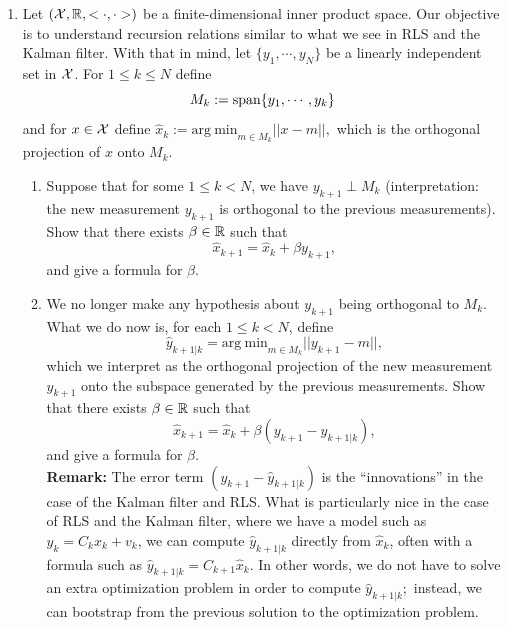 \documentclass[letterpaper]{article}
\begin{document}
\begin{enumerate}
\begin{enumerate}
    \item Compute the distribution of $X|_{\{Z=z\}}$ conditioned on $Y|_{\{ Z=z\} }= y$.

\item  Compute the conditional distribution of  $  X | _{\left[\begin{array}{r} Y=y\\  Z=z\end{array} \right] } $, or more compactly, $ X_{|Y=y,Z=z}$, the conditional distribution of  $X$ given the vector $[Y=y,Z=z]^\top$.

    \item Compare your answers for (b) and (c).
\end{enumerate}

\newpage

\item  Let $({\cal X}, \mathbb R, <\cdot, \cdot>)$ be a finite-dimensional inner product space. Our objective is to understand recursion relations similar to what we see in RLS and the Kalman filter. With that in mind, let $\{y_1, \cdots, y_N \}$ be a linearly independent set in ${\cal X}$. For $1 \le k \le N$ define     $$M_k: = \textrm{span} \{ y_1, \cdots, y_k \}$$
      and for $x \in {\cal X}$ define $ \widehat{x}_k := \mathrm{arg~min}_{m\in M_k} ||x-m||,$ which is the orthogonal projection of $x$ onto $M_k$.
  \begin{enumerate}
\setlength{\itemsep}{.1in}
\renewcommand{\labelenumi}{(\alph{enumi})}

\item  Suppose that for some $1 \le k < N$, we have $y_{k+1} \perp M_k$ (interpretation: the new measurement $y_{k+1}$ is orthogonal to the previous measurements). Show that there exists $\beta \in \mathbb R$ such that
$$\widehat{x}_{k+1} = \widehat{x}_k + \beta y_{k+1},$$
and give a formula for $\beta$.

\item We no longer make any hypothesis about $y_{k+1}$ being orthogonal to $M_k$. What we do now is, for each $1 \le k < N$, define
$$\widehat{y}_{k+1|k} = \mathrm{arg~min}_{m\in M_{k}} ||y_{k+1}-m||, $$
which we interpret as the orthogonal projection of the new measurement $y_{k+1}$ onto the subspace generated by the previous measurements.
Show that there exists $\beta \in \mathbb R$ such that
$$\widehat{x}_{k+1} = \widehat{x}_k + \beta (y_{k+1} - \widehat{y}_{k+1|k} ),$$
and give a formula for $\beta$. \\

\textbf{Remark:} The error term $ (y_{k+1} - \widehat{y}_{k+1|k} )$ is the ``innovations'' in the case of the Kalman filter and RLS. What is particularly nice in the case of RLS and the Kalman filter, where we have a model such as $y_k = C_k x_k + v_k$, we can compute $\widehat{y}_{k+1|k}$ directly from $ \widehat{x}_k$, often with a formula such as $\widehat{y}_{k+1|k} = C_{k+1}  \widehat{x}_k$. In other words, we do not have to solve an extra optimization problem in order to compute $\widehat{y}_{k+1|k};$ instead, we can bootstrap from the previous solution to the optimization problem.
\end{enumerate}




\end{enumerate}
\end{document}
